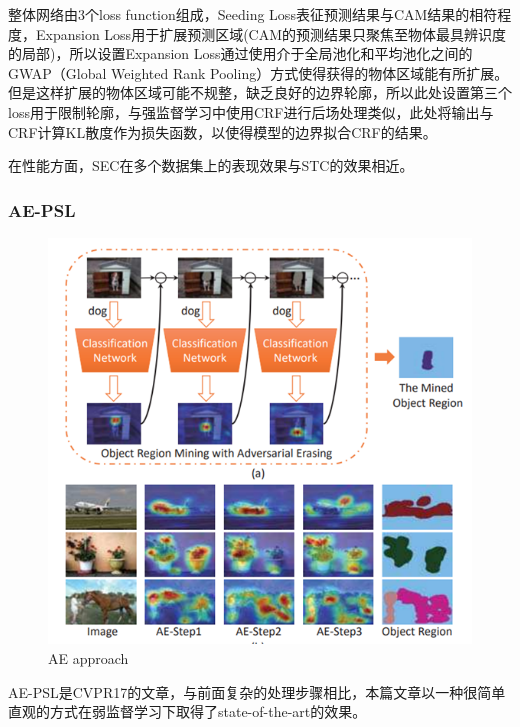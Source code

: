 \documentclass{article}
\begin{document}
\begin{CJK}{UTF8}{gbsn}
整体网络由3个loss function组成，Seeding Loss表征预测结果与CAM结果的相符程度，Expansion Loss用于扩展预测区域(CAM的预测结果只聚焦至物体最具辨识度的局部)，所以设置Expansion Loss通过使用介于全局池化和平均池化之间的GWAP（Global Weighted Rank Pooling）方式使得获得的物体区域能有所扩展。但是这样扩展的物体区域可能不规整，缺乏良好的边界轮廓，所以此处设置第三个loss用于限制轮廓，与强监督学习中使用CRF\cite{lafferty2001conditional}进行后场处理类似，此处将输出与CRF计算KL散度作为损失函数，以使得模型的边界拟合CRF\cite{lafferty2001conditional}的结果。
	
在性能方面，SEC\cite{kolesnikov2016seed}在多个数据集上的表现效果与STC\cite{wei2017stc}的效果相近。

\subsubsection{AE-PSL}
\begin{figure}[h]
    \centering
    \includegraphics[scale=0.5]{imgs/2-9_AE_approach.png}
    \caption{AE approach}
    \label{AE}
\end{figure}

AE-PSL\cite{wei2017object}是CVPR17的文章，与前面复杂的处理步骤相比，本篇文章以一种很简单直观的方式在弱监督学习下取得了state-of-the-art的效果。


\end{CJK}
\end{document}

